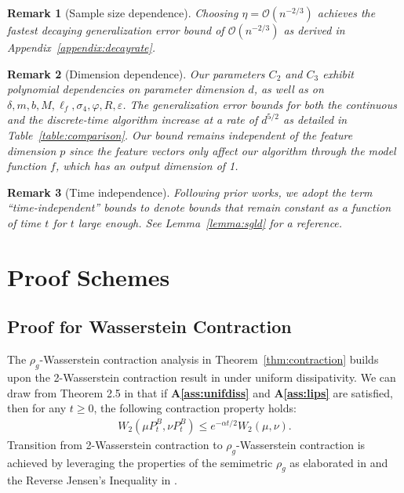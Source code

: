 \documentclass{article}
\newtheorem{remark}{Remark}
\begin{document}
\begin{remark}[Sample size dependence]\label{remark:decayrate}
    Choosing $\eta = \mathcal{O}(n^{-2/3})$ achieves the fastest decaying generalization error bound of $\mathcal{O}(n^{-2/3})$ as derived in Appendix~\ref{appendix:decayrate}.
\end{remark}

\begin{remark}[Dimension dependence]
    Our parameters $C_2$ and $C_3$ exhibit polynomial dependencies on parameter dimension $d$, as well as on $\delta, m, b, M, \ell_f, \sigma_4, \varphi, R, \varepsilon$. The generalization error bounds for both the continuous and the discrete-time algorithm increase at a rate of $d^{5/2}$ as detailed in Table~\ref{table:comparison}. Our bound remains independent of the feature dimension $p$ since the feature vectors only affect our algorithm through the model function $f$, which has an output dimension of 1.
\end{remark}

\begin{remark}[Time independence]
    Following prior works, we adopt the term ``time-independent'' bounds to denote bounds that remain constant as a function of time $t$ for $t$ large enough. See Lemma~\ref{lemma:sgld} for a reference.
\end{remark}



\section{Proof Schemes}\label{sec:proofschemes}

\subsection{Proof for Wasserstein Contraction}
The $\rho_g$-Wasserstein contraction analysis in Theorem~\ref{thm:contraction} builds upon the 2-Wasserstein contraction result in \citet{Wang} under uniform dissipativity. We can draw from Theorem 2.5 in \citet{Wang} that if \textbf{A\ref{ass:unifdiss}} and \textbf{A\ref{ass:lips}} are satisfied, then for any $t \geq 0$, the following contraction property holds:
\begin{align}\label{eq:2contract}
    W_2(\mu P_t^B, \nu P_t^B) \leq e^{-\alpha t /2} W_2(\mu, \nu).
\end{align}
Transition from 2-Wasserstein contraction to $\rho_g$-Wasserstein contraction is achieved by leveraging the properties of the semimetric $\rho_g$ as elaborated in \citet{Farghly} and the Reverse Jensen's Inequality in \citet{wunder2021reverse}.
\end{document}
